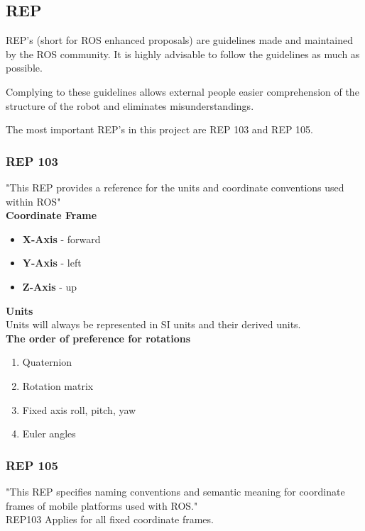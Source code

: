 \subsection{REP}
REP's (short for ROS enhanced proposals) are guidelines made and maintained by the ROS community. It is highly advisable to follow the guidelines as much as possible.

Complying to these guidelines allows external people easier comprehension of the structure of the robot and eliminates misunderstandings.

The most important REP's in this project are REP 103 and REP 105.
\subsubsection{REP 103}
	
	"This REP provides a reference for the units and coordinate conventions used within ROS"\cite{REP103}\\  
	
	\textbf{Coordinate Frame}
	\begin{itemize}
		\item \textbf{X-Axis} - forward
		\item \textbf{Y-Axis} - left
		\item \textbf{Z-Axis} - up
	\end{itemize}
	
	\textbf{Units}\\
	
	Units will always be represented in SI units and their derived units.\\
	
	\textbf{The order of preference for rotations}
	\begin{enumerate}
		\item Quaternion
		\item Rotation matrix
		\item Fixed axis roll, pitch, yaw
		\item Euler angles
	\end{enumerate}
	\cite{REP103}
	
\subsubsection{REP 105}
	"This REP specifies naming conventions and semantic meaning for coordinate frames of mobile platforms used with ROS."\cite{REP105}\\
	
	REP103 Applies for all fixed coordinate frames.
	
